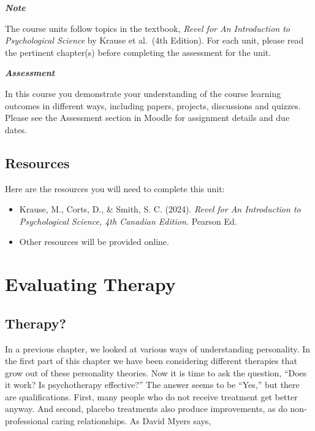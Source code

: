 \documentclass[
]{book}
\providecommand{\tightlist}{%
  \setlength{\itemsep}{0pt}\setlength{\parskip}{0pt}}
\begin{document}
\begin{caution}
\textbf{\emph{Note}}

The course units follow topics in the textbook, \emph{Revel for An Introduction to Psychological Science} by Krause et al.~(4th Edition). For each unit, please read the pertinent chapter(s) before completing the assessment for the unit.
\end{caution}

\begin{assessment}
\textbf{\emph{Assessment}}

In this course you demonstrate your understanding of the course learning outcomes in different ways, including papers, projects, discussions and quizzes. Please see the Assessment section in Moodle for assignment details and due dates.
\end{assessment}

\hypertarget{resources-11}{%
\subsection*{Resources}\label{resources-11}}

Here are the resources you will need to complete this unit:

\begin{itemize}
\tightlist
\item
  Krause, M., Corts, D., \& Smith, S. C. (2024). \emph{Revel for An Introduction to Psychological Science, 4th Canadian Edition.} Pearson Ed.\\
\item
  Other resources will be provided online.
\end{itemize}

\hypertarget{evaluating-therapy}{%
\section{Evaluating Therapy}\label{evaluating-therapy}}

\hypertarget{therapy}{%
\subsection*{Therapy?}\label{therapy}}

In a previous chapter, we looked at various ways of understanding personality. In the first part of this chapter we have been considering different therapies that grow out of these personality theories. Now it is time to ask the question, ``Does it work? Is psychotherapy effective?'' The answer seems to be ``Yes,'' but there are qualifications. First, many people who do not receive treatment get better anyway. And second, placebo treatments also produce improvements, as do non-professional caring relationships. As David Myers says,
\end{document}
